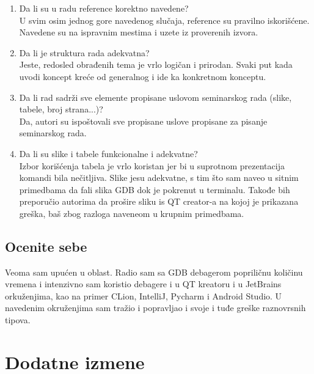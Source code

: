 \documentclass[a4paper]{report}
\begin{document}
\begin{enumerate}
\item Da li su u radu reference korektno navedene?\\
U svim osim jednog gore navedenog slučaja, reference su pravilno iskorišćene. Navedene su na ispravnim mestima i uzete iz proverenih izvora.
\item Da li je struktura rada adekvatna?\\
Jeste, redosled obrađenih tema je vrlo logičan i prirodan. Svaki put kada uvodi koncept kreće od generalnog i ide ka konkretnom konceptu.
\item Da li rad sadrži sve elemente propisane uslovom seminarskog rada (slike, tabele, broj strana...)?\\
Da, autori su ispoštovali sve propisane uslove propisane za pisanje seminarskog rada.

\item Da li su slike i tabele funkcionalne i adekvatne?\\
Izbor korišćenja tabela je vrlo koristan jer bi u suprotnom prezentacija komandi bila nečitljiva. Slike jesu adekvatne, s tim što sam naveo u sitnim primedbama da fali slika GDB dok je pokrenut u terminalu. Takođe bih preporučio autorima da prošire sliku is QT creator-a na kojoj je prikazana greška, baš zbog razloga naveneom u krupnim primedbama.
\end{enumerate}

\section{Ocenite sebe}
Veoma sam upućen u oblast. Radio sam sa GDB debagerom popriličnu količinu vremena i intenzivno sam koristio debagere i u QT kreatoru i u JetBrains orkuženjima, kao na primer CLion, IntelliJ, Pycharm i Android Studio. U navedenim okruženjima sam tražio i popravljao i svoje i tuđe greške raznovrsnih tipova.


\chapter{Dodatne izmene}
\end{document}
